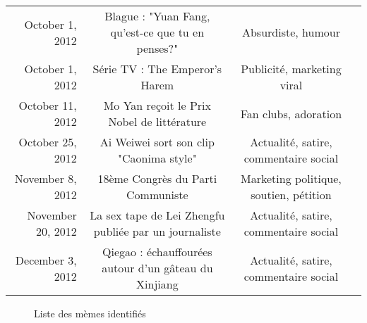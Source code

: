 \begin{landscape}
\begin{table}
\begin{tabulary}{\linewidth}{ r| C C C}
            October 1, 2012 & 
            Blague : "Yuan Fang, qu'est-ce que tu en penses?"  & 
            Absurdiste, humour & 
             \\

            October 1, 2012 &
            Série TV : The Emperor's Harem & 
            Publicité, marketing viral &
             \\

            October 11, 2012  &
            Mo Yan reçoit le Prix Nobel de littérature &
            Fan clubs, adoration  &
             \\

            October 25, 2012 &
            Ai Weiwei sort son clip "Caonima style"&
            Actualité, satire, commentaire social &
            \\

            November 8, 2012 &
            18ème Congrès du Parti Communiste &
            Marketing politique, soutien, pétition &
            \\

            November 20, 2012 &
            La sex tape de Lei Zhengfu publiée par un journaliste &
            Actualité, satire, commentaire social &
            \\

            December 3, 2012  &
            Qiegao : échauffourées autour d'un gâteau du Xinjiang &
            Actualité, satire, commentaire social &
            \\

        \end{tabulary}
    \end{table}
    \begin{figure}
        \label{fig:memelist}
        \caption[Liste des mèmes identifiés]{Liste des mèmes identifiés}
    \end{figure}
\end{landscape}